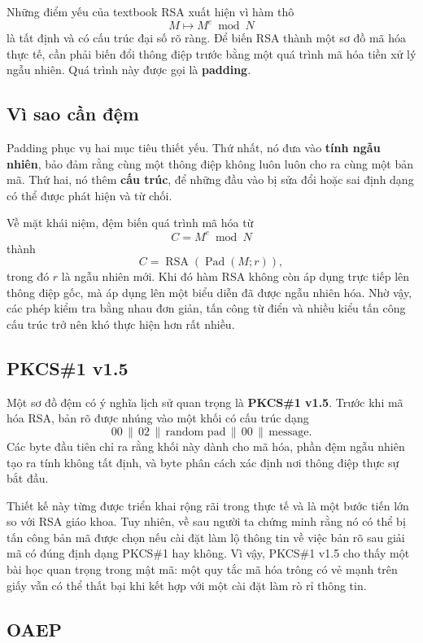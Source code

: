 Những điểm yếu của textbook RSA xuất hiện vì hàm thô
\[
M \mapsto M^e \bmod N
\]
là tất định và có cấu trúc đại số rõ ràng. Để biến RSA thành một sơ đồ mã hóa thực tế, cần phải biến đổi thông điệp trước bằng một quá trình mã hóa tiền xử lý ngẫu nhiên. Quá trình này được gọi là \textbf{padding}.

\subsection{Vì sao cần đệm}

Padding phục vụ hai mục tiêu thiết yếu. Thứ nhất, nó đưa vào \textbf{tính ngẫu nhiên}, bảo đảm rằng cùng một thông điệp không luôn luôn cho ra cùng một bản mã. Thứ hai, nó thêm \textbf{cấu trúc}, để những đầu vào bị sửa đổi hoặc sai định dạng có thể được phát hiện và từ chối.

Về mặt khái niệm, đệm biến quá trình mã hóa từ
\[
C = M^e \bmod N
\]
thành
\[
C = \operatorname{RSA}(\operatorname{Pad}(M;r)),
\]
trong đó $r$ là ngẫu nhiên mới. Khi đó hàm RSA không còn áp dụng trực tiếp lên thông điệp gốc, mà áp dụng lên một biểu diễn đã được ngẫu nhiên hóa. Nhờ vậy, các phép kiểm tra bằng nhau đơn giản, tấn công từ điển và nhiều kiểu tấn công cấu trúc trở nên khó thực hiện hơn rất nhiều.

\subsection{PKCS\#1 v1.5}

Một sơ đồ đệm có ý nghĩa lịch sử quan trọng là \textbf{PKCS\#1 v1.5}. Trước khi mã hóa RSA, bản rõ được nhúng vào một khối có cấu trúc dạng
\[
00 \,\|\, 02 \,\|\, \text{random pad} \,\|\, 00 \,\|\, \text{message}.
\]
Các byte đầu tiên chỉ ra rằng khối này dành cho mã hóa, phần đệm ngẫu nhiên tạo ra tính không tất định, và byte phân cách xác định nơi thông điệp thực sự bắt đầu.

Thiết kế này từng được triển khai rộng rãi trong thực tế và là một bước tiến lớn so với RSA giáo khoa. Tuy nhiên, về sau người ta chứng minh rằng nó có thể bị tấn công bản mã được chọn nếu cài đặt làm lộ thông tin về việc bản rõ sau giải mã có đúng định dạng PKCS\#1 hay không. Vì vậy, PKCS\#1 v1.5 cho thấy một bài học quan trọng trong mật mã: một quy tắc mã hóa trông có vẻ mạnh trên giấy vẫn có thể thất bại khi kết hợp với một cài đặt làm rò rỉ thông tin.

\subsection{OAEP}


